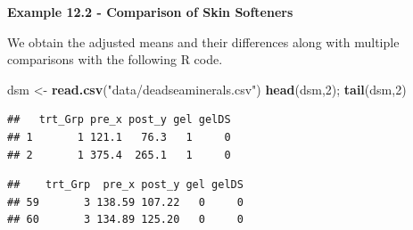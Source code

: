 \documentclass[
]{book}
\newenvironment{Shaded}{\begin{snugshade}}{\end{snugshade}}
\newcommand{\AttributeTok}[1]{\textcolor[rgb]{0.13,0.29,0.53}{#1}}
\newcommand{\DecValTok}[1]{\textcolor[rgb]{0.00,0.00,0.81}{#1}}
\newcommand{\FunctionTok}[1]{\textcolor[rgb]{0.13,0.29,0.53}{\textbf{#1}}}
\newcommand{\NormalTok}[1]{#1}
\newcommand{\OtherTok}[1]{\textcolor[rgb]{0.56,0.35,0.01}{#1}}
\newcommand{\SpecialCharTok}[1]{\textcolor[rgb]{0.81,0.36,0.00}{\textbf{#1}}}
\newcommand{\StringTok}[1]{\textcolor[rgb]{0.31,0.60,0.02}{#1}}
\begin{document}
\textbf{Example 12.2 - Comparison of Skin Softeners}

We obtain the adjusted means and their differences along with multiple
comparisons with the following R code.

\begin{Shaded}
\begin{Highlighting}[]
\NormalTok{dsm }\OtherTok{\textless{}{-}} \FunctionTok{read.csv}\NormalTok{(}\StringTok{"data/deadseaminerals.csv"}\NormalTok{)}
\FunctionTok{head}\NormalTok{(dsm,}\DecValTok{2}\NormalTok{); }\FunctionTok{tail}\NormalTok{(dsm,}\DecValTok{2}\NormalTok{)}
\end{Highlighting}
\end{Shaded}

\begin{verbatim}
##   trt_Grp pre_x post_y gel gelDS
## 1       1 121.1   76.3   1     0
## 2       1 375.4  265.1   1     0
\end{verbatim}

\begin{verbatim}
##    trt_Grp  pre_x post_y gel gelDS
## 59       3 138.59 107.22   0     0
## 60       3 134.89 125.20   0     0
\end{verbatim}

\begin{Shaded}
\end{Shaded}
\end{document}
